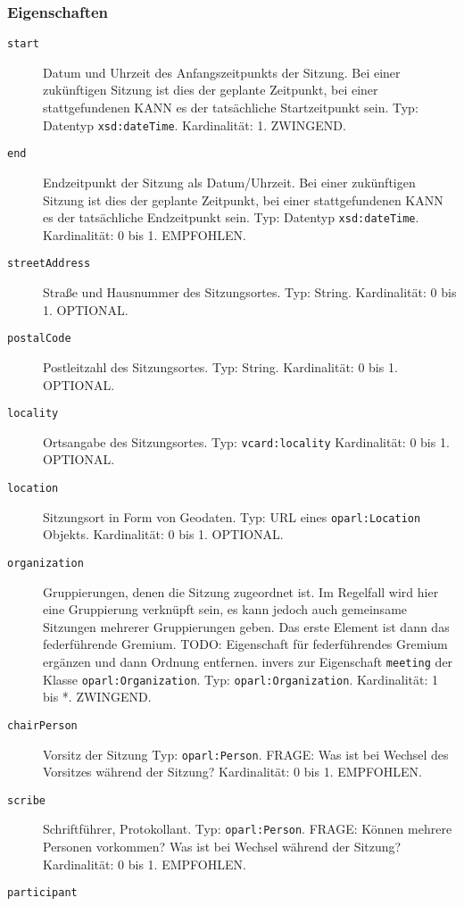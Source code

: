 \documentclass[,a4paper]{article}
\begin{document}
\subsubsection{Eigenschaften}\label{eigenschaften-4}

\begin{description}
\item[\texttt{start}]
Datum und Uhrzeit des Anfangszeitpunkts der Sitzung. Bei einer
zukünftigen Sitzung ist dies der geplante Zeitpunkt, bei einer
stattgefundenen KANN es der tatsächliche Startzeitpunkt sein. Typ:
Datentyp \texttt{xsd:dateTime}. Kardinalität: 1. ZWINGEND.
\item[\texttt{end}]
Endzeitpunkt der Sitzung als Datum/Uhrzeit. Bei einer zukünftigen
Sitzung ist dies der geplante Zeitpunkt, bei einer stattgefundenen KANN
es der tatsächliche Endzeitpunkt sein. Typ: Datentyp
\texttt{xsd:dateTime}. Kardinalität: 0 bis 1. EMPFOHLEN.
\item[\texttt{streetAddress}]
Straße und Hausnummer des Sitzungsortes. Typ: String. Kardinalität: 0
bis 1. OPTIONAL.
\item[\texttt{postalCode}]
Postleitzahl des Sitzungsortes. Typ: String. Kardinalität: 0 bis 1.
OPTIONAL.
\item[\texttt{locality}]
Ortsangabe des Sitzungsortes. Typ: \texttt{vcard:locality} Kardinalität:
0 bis 1. OPTIONAL.
\item[\texttt{location}]
Sitzungsort in Form von Geodaten. Typ: URL eines \texttt{oparl:Location}
Objekts. Kardinalität: 0 bis 1. OPTIONAL.
\item[\texttt{organization}]
Gruppierungen, denen die Sitzung zugeordnet ist. Im Regelfall wird hier
eine Gruppierung verknüpft sein, es kann jedoch auch gemeinsame
Sitzungen mehrerer Gruppierungen geben. Das erste Element ist dann das
federführende Gremium. TODO: Eigenschaft für federführendes Gremium
ergänzen und dann Ordnung entfernen. invers zur Eigenschaft
\texttt{meeting} der Klasse \texttt{oparl:Organization}. Typ:
\texttt{oparl:Organization}. Kardinalität: 1 bis *. ZWINGEND.
\item[\texttt{chairPerson}]
Vorsitz der Sitzung Typ: \texttt{oparl:Person}. FRAGE: Was ist bei
Wechsel des Vorsitzes während der Sitzung? Kardinalität: 0 bis 1.
EMPFOHLEN.
\item[\texttt{scribe}]
Schriftführer, Protokollant. Typ: \texttt{oparl:Person}. FRAGE: Können
mehrere Personen vorkommen? Was ist bei Wechsel während der Sitzung?
Kardinalität: 0 bis 1. EMPFOHLEN.
\item[\texttt{participant}]

\end{description}
\end{document}
